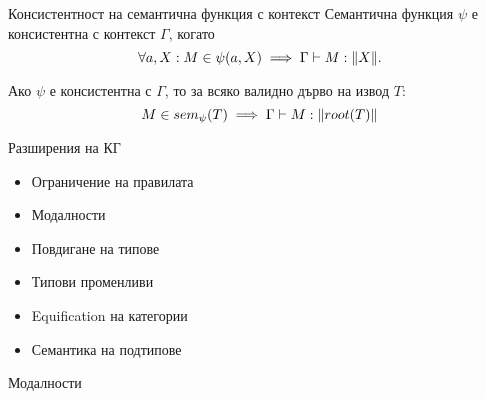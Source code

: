 \documentclass[9pt]{beamer}
\begin{document}
  \begin{frame}{Консистентност на семантична функция с контекст}
    Семантична функция $\psi$ е консистентна с контекст $\Gamma$, когато
    \[
        \forall a, X: M \in \psi(a, X) \implies \Gamma \vdash M : \|X\|.
    \]

    Ако $\psi$ е консистентна с $\Gamma$, то за всяко валидно дърво на извод
    $T$:
    \[
        M \in sem_{\psi}(T) \implies \Gamma \vdash M : \|root(T)\|
    \]
  \end{frame}

  \begin{frame}{Разширения на КГ}
    \begin{itemize}
      \item Ограничение на правилата
      \item Модалности
      \item Повдигане на типове
      \item Типови променливи
      \item Equification на категории
      \item Семантика на подтипове
    \end{itemize}
  \end{frame}

  \begin{frame}{Модалности}
    \begin{center}
    \end{center}
  \end{frame}
\end{document}
